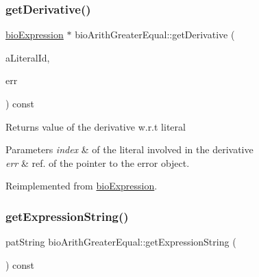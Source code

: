 \subsubsection{\texorpdfstring{get\+Derivative()}{getDerivative()}}
{\footnotesize\ttfamily \hyperlink{classbio_expression}{bio\+Expression} $\ast$ bio\+Arith\+Greater\+Equal\+::get\+Derivative (\begin{DoxyParamCaption}\item[{pat\+U\+Long}]{a\+Literal\+Id,  }\item[{pat\+Error $\ast$\&}]{err }\end{DoxyParamCaption}) const\hspace{0.3cm}{\ttfamily [virtual]}}

\begin{DoxyReturn}{Returns}
value of the derivative w.\+r.\+t literal 
\end{DoxyReturn}

\begin{DoxyParams}{Parameters}
{\em index} & of the literal involved in the derivative \\
\hline
{\em err} & ref. of the pointer to the error object. \\
\hline
\end{DoxyParams}


Reimplemented from \hyperlink{classbio_expression_a5915579d1193f25f216c1e273c97f2ce}{bio\+Expression}.

\mbox{\label{classbio_arith_greater_equal_a6585da182f8a3cf7063f55be1b68af6c}} 
\subsubsection{\texorpdfstring{get\+Expression\+String()}{getExpressionString()}}
{\footnotesize\ttfamily pat\+String bio\+Arith\+Greater\+Equal\+::get\+Expression\+String (\begin{DoxyParamCaption}{ }\end{DoxyParamCaption}) const\hspace{0.3cm}{\ttfamily [virtual]}}

